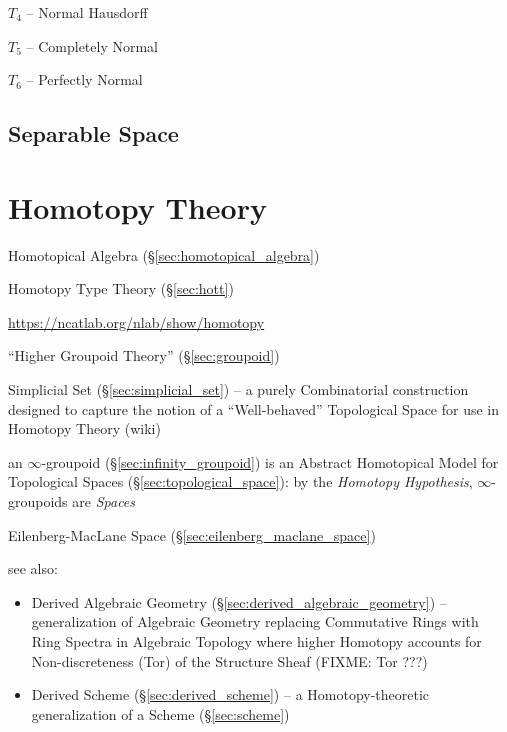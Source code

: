 $\xspace{T}_4$ -- Normal Hausdorff

$\xspace{T}_5$ -- Completely Normal

$\xspace{T}_6$ -- Perfectly Normal



\subsection{Separable Space}\label{sec:separable_space}



\section{Homotopy Theory}\label{sec:homotopy_theory}

Homotopical Algebra (\S\ref{sec:homotopical_algebra})

Homotopy Type Theory (\S\ref{sec:hott})

\url{https://ncatlab.org/nlab/show/homotopy}

``Higher Groupoid Theory'' (\S\ref{sec:groupoid})

Simplicial Set (\S\ref{sec:simplicial_set}) -- a purely Combinatorial
construction designed to capture the notion of a ``Well-behaved'' Topological
Space for use in Homotopy Theory (wiki)

\fist an $\infty$-groupoid (\S\ref{sec:infinity_groupoid}) is an Abstract
Homotopical Model for Topological Spaces (\S\ref{sec:topological_space}): by the
\emph{Homotopy Hypothesis}, $\infty$-groupoids are \emph{Spaces}

Eilenberg-MacLane Space (\S\ref{sec:eilenberg_maclane_space})

see also:
\begin{itemize}
  \item Derived Algebraic Geometry (\S\ref{sec:derived_algebraic_geometry}) --
    generalization of Algebraic Geometry replacing Commutative Rings with Ring
    Spectra in Algebraic Topology where higher Homotopy accounts for
    Non-discreteness (Tor) of the Structure Sheaf (FIXME: Tor ???)
  \item Derived Scheme (\S\ref{sec:derived_scheme}) -- a Homotopy-theoretic
    generalization of a Scheme (\S\ref{sec:scheme})
\end{itemize}



